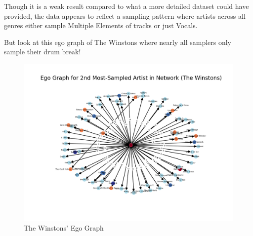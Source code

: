 \documentclass[pageno]{jpaper}
\begin{document}
Though it is a weak result compared to what a more detailed dataset could have provided, the data appears to reflect a sampling pattern where artists across all genres either sample Multiple Elements of tracks or just Vocals.

But look at this ego graph of The Winstons where nearly all samplers only sample their drum break!
\begin{figure}[H]
\includegraphics{./EgoGraphs/egoGraphMostSampled2TheWinstons}
\caption{The Winstons' Ego Graph}
\centering
\end{figure}
\end{document}
